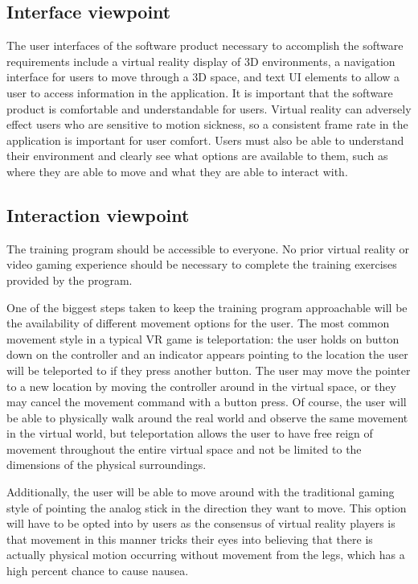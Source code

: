 \documentclass[onecolumn, draftclsnofoot,10pt, compsoc]{IEEEtran}
\begin{document}
\subsection{Interface viewpoint}
The user interfaces of the software product necessary to accomplish the software requirements include a virtual reality display of 3D environments, a navigation interface for users to move through a 3D space, and text UI elements to allow a user to access information in the application. It is important that the software product is comfortable and understandable for users. Virtual reality can adversely effect users who are sensitive to motion sickness, so a consistent frame rate in the application is important for user comfort. Users must also be able to understand their environment and clearly see what options are available to them, such as where they are able to move and what they are able to interact with.

\subsection{Interaction viewpoint}
The training program should be accessible to everyone. No prior virtual reality or video gaming experience should be necessary to complete the training exercises provided by the program.

One of the biggest steps taken to keep the training program approachable will be the availability of different movement options for the user. The most common movement style in a typical VR game is teleportation: the user holds on button down on the controller and an indicator appears pointing to the location the user will be teleported to if they press another button. The user may move the pointer to a new location by moving the controller around in the virtual space, or they may cancel the movement command with a button press. Of course, the user will be able to physically walk around the real world and observe the same movement in the virtual world, but teleportation allows the user to have free reign of movement throughout the entire virtual space and not be limited to the dimensions of the physical surroundings.

Additionally, the user will be able to move around with the traditional gaming style of pointing the analog stick in the direction they want to move. This option will have to be opted into by users as the consensus of virtual reality players is that movement in this manner tricks their eyes into believing that there is actually physical motion occurring without movement from the legs, which has a high percent chance to cause nausea.
\end{document}
